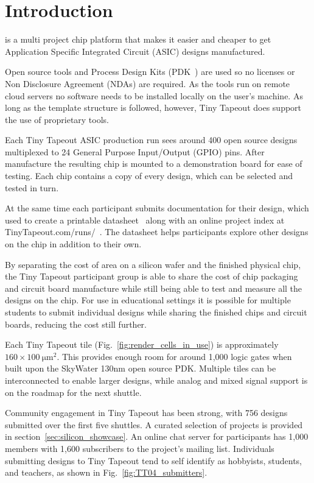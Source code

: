 \section{Introduction}
\label{sec:introduction}
 is a multi project chip platform that makes it easier and cheaper to get Application Specific Integrated Circuit (ASIC) designs manufactured.

Open source tools and Process Design Kits (PDK~\cite{pdk}) are used so no licenses or Non Disclosure Agreement (NDAs) are required. As the tools run on remote cloud servers no software needs to be installed locally on the user's machine. As long as the template structure is followed, however, Tiny Tapeout does support the use of proprietary tools.

Each Tiny Tapeout ASIC production run sees around 400 open source designs multiplexed to 24 General Purpose Input/Output (GPIO) pins. After manufacture the resulting chip is mounted to a demonstration board for ease of testing. Each chip contains a copy of every design, which can be selected and tested in turn.

At the same time each participant submits documentation for their design, which used to create a printable datasheet~\cite{datasheet} along with an online project index at TinyTapeout.com/runs/~\cite{tinytapeoutruns}. The datasheet helps participants explore other designs on the chip in addition to their own.

By separating the cost of area on a silicon wafer and the finished physical chip, the Tiny Tapeout participant group is able to share the cost of chip packaging and circuit board manufacture while still being able to test and measure all the designs on the chip. For use in educational settings it is possible for multiple students to submit individual designs while sharing the finished chips and circuit boards, reducing the cost still further.

Each Tiny Tapeout tile (Fig.~\ref{fig:render_cells_in_use}) is approximately $160 \times \qty{100}{\micro\meter\squared}$. This provides enough room for around 1,000 logic gates when built upon the SkyWater 130nm open source PDK. Multiple tiles can be interconnected to enable larger designs, while analog and mixed signal support is on the roadmap for the next shuttle.

Community engagement in Tiny Tapeout has been strong, with 756 designs submitted over the first five shuttles. A curated selection of projects is provided in section~\ref{sec:silicon_showcase}.
An online chat server for participants has 1,000 members with 1,600 subscribers to the project's mailing list. Individuals submitting designs to Tiny Tapeout tend to self identify as hobbyists, students, and teachers, as shown in Fig.~\ref{fig:TT04_submitters}.

